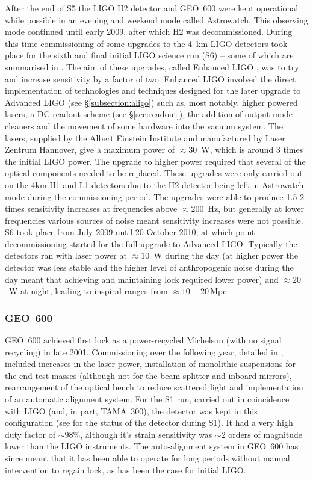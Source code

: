 \documentclass{article}
\begin{document}
After the end of S5 the LIGO H2 detector and GEO~600 were kept operational while
possible in an evening and weekend mode called Astrowatch. This observing mode
continued until early 2009, after which H2 was decommissioned. During this time
commissioning of some upgrades to the 4~km LIGO detectors took place for the
sixth and final initial LIGO science run (S6) -- some of which are summarised in
\cite{Whitcomb:2008}. The aim of these upgrades, called Enhanced LIGO
\cite{EnhancedLIGO}, was to try and  increase sensitivity by a factor of two. 
Enhanced LIGO involved the direct implementation of technologies and techniques 
designed for the later upgrade to Advanced LIGO (see \S\ref{subsection:aligo}) 
such as, most notably, higher powered lasers, a DC readout scheme (see
\S\ref{sec:readout}), the addition of output mode cleaners and the movement of
some hardware into the vacuum system. The lasers, supplied by the Albert
Einstein Institute and manufactured by Laser Zentrum Hannover, give a maximum
power of $\approx30$~W, which is around 3 times the initial LIGO power. The
upgrade to higher power required that several of the optical components needed
to be replaced. These upgrades were only carried out on the 4km H1 and L1
detectors due to the H2 detector being left in Astrowatch mode during the
commissioning period. The upgrades were able to produce 1.5-2 times sensitivity
increases at frequencies above $\approx 200$~Hz, but generally at lower
frequencies various sources of noise meant sensitivity increases were not
possible. S6 took place from July 2009 until 20 October 2010, at which point
decommissioning started for the full upgrade to Advanced LIGO. Typically the
detectors ran with laser power at $\approx10$~W during the day (at higher power
the detector was less stable and the higher level of anthropogenic noise during
the day meant that achieving and maintaining lock required lower power) and
$\approx 20$~W at night, leading to inspiral ranges from $\approx 10-20$\,Mpc.

\subsubsection{GEO~600}
GEO~600 achieved first lock as a power-recycled Michelson (with no signal
recycling) in late 2001. Commissioning over the following year, detailed in
\cite{Hewitson:2003}, included increases in the laser power, installation of
monolithic suspensions for the end test masses (although not for the beam
splitter and inboard mirrors), rearrangement of the optical bench to reduce
scattered light and implementation of an automatic alignment system. For the S1
run, carried out in coincidence with LIGO (and, in part, TAMA~300), the detector
was kept in this configuration (see \cite{Abbott:2004a} for the status of the
detector during S1). It had a very high duty factor of $\sim98\%$, although
it's strain sensitivity was $\sim2$ orders of magnitude lower than the LIGO
instruments. The auto-alignment system in GEO~600 has since meant that it has
been able to operate for long periods without manual intervention to regain
lock, as has been the case for initial LIGO.
\end{document}
